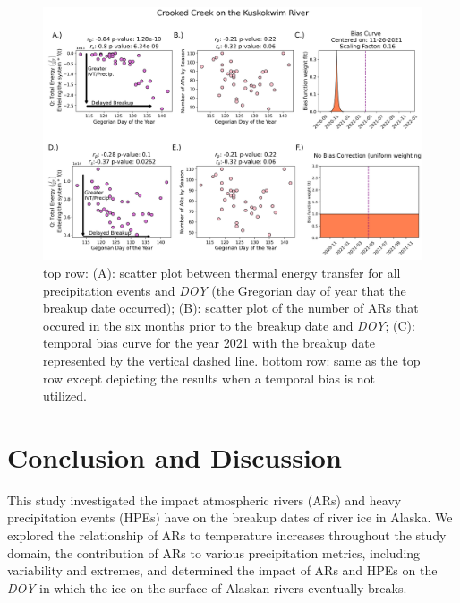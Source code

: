 \documentclass[12pts,draft]{AR_analysis_}
\begin{document}

\begin{figure}[H]
\centering
\includegraphics[width=1.0\textwidth]{./images/concatenated_scatter_bias_plots.png}
	\caption{top row: (A): scatter plot between thermal energy
	transfer for all precipitation events and \emph{DOY} (the Gregorian day of year
	that the breakup date occurred); (B): scatter plot of the number of ARs
	that occured in the six months prior to the breakup date and
	\emph{DOY}; 
	(C): temporal bias curve for the year 2021 with the breakup
	date represented by the vertical dashed line. bottom row: same as
	the top row except depicting the results when a temporal bias
	is not utilized.}
\label{fig:concatenated_corr_plots}
\end{figure}

\section{Conclusion and Discussion}

This study investigated the impact atmospheric rivers (ARs) and heavy precipitation events
(HPEs) have on the breakup dates of 
river ice in Alaska. We explored the relationship of ARs to temperature increases throughout 
the study domain, the contribution of ARs to various precipitation metrics, 
including variability and extremes, and determined the impact of ARs and HPEs on the \emph{DOY} 
in which the ice on the surface of Alaskan rivers eventually breaks. 
\end{document}
